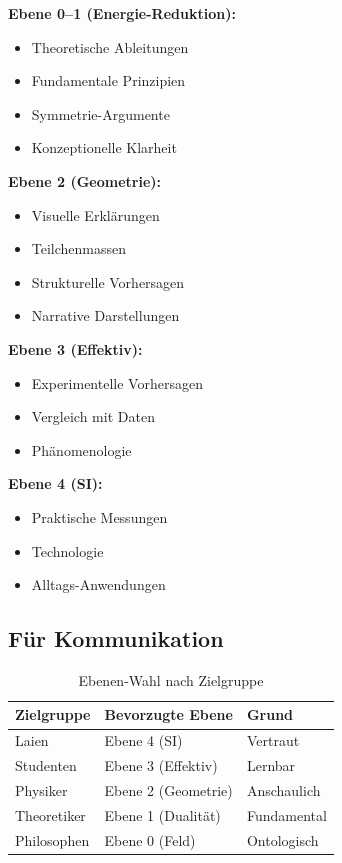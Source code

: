 \begin{important}
\textbf{Ebene 0--1 (Energie-Reduktion):}
\begin{itemize}
\item Theoretische Ableitungen
\item Fundamentale Prinzipien
\item Symmetrie-Argumente
\item Konzeptionelle Klarheit
\end{itemize}

\textbf{Ebene 2 (Geometrie):}
\begin{itemize}
\item Visuelle Erklärungen
\item Teilchenmassen
\item Strukturelle Vorhersagen
\item Narrative Darstellungen
\end{itemize}

\textbf{Ebene 3 (Effektiv):}
\begin{itemize}
\item Experimentelle Vorhersagen
\item Vergleich mit Daten
\item Phänomenologie
\end{itemize}

\textbf{Ebene 4 (SI):}
\begin{itemize}
\item Praktische Messungen
\item Technologie
\item Alltags-Anwendungen
\end{itemize}
\end{important}

\subsection{Für Kommunikation}

\begin{table}[h]
\centering
\begin{tabular}{lll}
\toprule
\textbf{Zielgruppe} & \textbf{Bevorzugte Ebene} & \textbf{Grund} \\
\midrule
Laien & Ebene 4 (SI) & Vertraut \\
Studenten & Ebene 3 (Effektiv) & Lernbar \\
Physiker & Ebene 2 (Geometrie) & Anschaulich \\
Theoretiker & Ebene 1 (Dualität) & Fundamental \\
Philosophen & Ebene 0 (Feld) & Ontologisch \\
\bottomrule
\end{tabular}
\caption{Ebenen-Wahl nach Zielgruppe}
\end{table}


